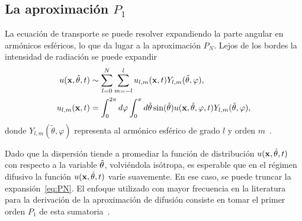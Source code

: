 \subsection{La aproximación $P_1$}
La ecuación  de transporte se puede resolver expandiendo 
la parte angular en armónicos esféricos, 
lo que da lugar a la aproximación $P_N$. Lejos de los bordes la intensidad de radiación se puede expandir
\begin{equation}
\begin{split}
\begin{aligned}
u(\mathbf{x},\hat{\theta},t)&\sim \sum_{l=0}^{N}\sum_{m=-l}^lu_{l,m}(\mathbf{x},t)Y_{l,m}(\tilde{\theta},\varphi), \\ 
u_{l,m}(\mathbf{x},t)&=\int_{0}^{2\pi} d\varphi \int_0^{\pi} d\tilde{\theta} \sin (\tilde{\theta})  u(\mathbf{x},\tilde{\theta},\varphi,t) Y_{l,m}(\tilde{\theta},\varphi) ,
\end{aligned}
\end{split}
\label{eq:PN}
\end{equation}
donde $Y_{l,m}(\tilde{\theta},\varphi)$ representa al armónico esférico de grado $l$ y orden $m$~\cite{Sansone1991}.


 Dado que la dispersión tiende a promediar la función de distribución $u(\mathbf{x},\hat{\theta},t)$ con respecto a la variable $\hat{\theta}$, volviéndola isótropa, es esperable que en el régimen difusivo la función $u(\mathbf{x},\hat{\theta},t)$ varíe suavemente. En ese caso, se puede 
truncar la expansión~\eqref{eq:PN}. El enfoque utilizado con mayor frecuencia en la literatura 
para la derivación de la aproximación de difusión consiste 
en tomar  el primer orden $P_1$ de esta sumatoria~\cite{Arridge2009,Wang2009}.

